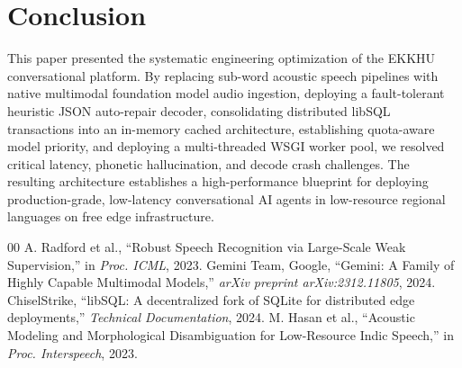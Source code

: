 \documentclass[conference]{IEEEtran}
\begin{document}
\section{Conclusion}
This paper presented the systematic engineering optimization of the EKKHU conversational platform. By replacing sub-word acoustic speech pipelines with native multimodal foundation model audio ingestion, deploying a fault-tolerant heuristic JSON auto-repair decoder, consolidating distributed libSQL transactions into an in-memory cached architecture, establishing quota-aware model priority, and deploying a multi-threaded WSGI worker pool, we resolved critical latency, phonetic hallucination, and decode crash challenges. The resulting architecture establishes a high-performance blueprint for deploying production-grade, low-latency conversational AI agents in low-resource regional languages on free edge infrastructure.

\begin{thebibliography}{00}
 A. Radford et al., ``Robust Speech Recognition via Large-Scale Weak Supervision,'' in \textit{Proc. ICML}, 2023.
 Gemini Team, Google, ``Gemini: A Family of Highly Capable Multimodal Models,'' \textit{arXiv preprint arXiv:2312.11805}, 2024.
 ChiselStrike, ``libSQL: A decentralized fork of SQLite for distributed edge deployments,'' \textit{Technical Documentation}, 2024.
 M. Hasan et al., ``Acoustic Modeling and Morphological Disambiguation for Low-Resource Indic Speech,'' in \textit{Proc. Interspeech}, 2023.
\end{thebibliography}
\end{document}
